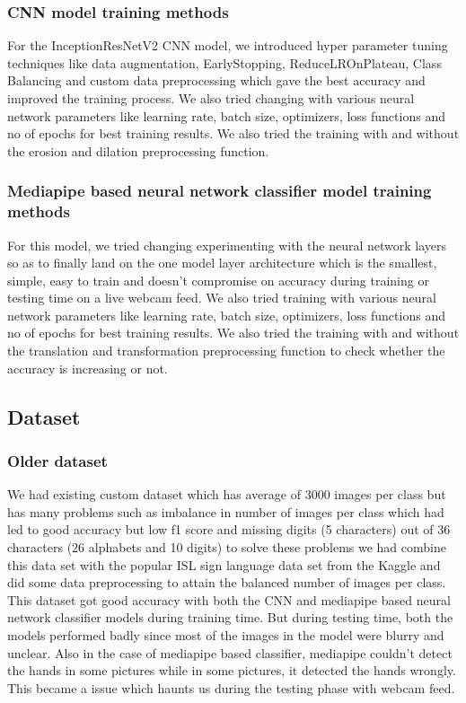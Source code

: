\documentclass[12pt,a4paper]{report}
\begin{document}
\subsubsection{CNN model training methods}
For the InceptionResNetV2 CNN model, we introduced hyper parameter tuning techniques like data augmentation, EarlyStopping, ReduceLROnPlateau, Class Balancing and custom data preprocessing which gave the best accuracy and improved the training process. We also tried changing with various neural network parameters like learning rate, batch size, optimizers, loss functions and no of epochs for best training results. We also tried the training with and without the erosion and dilation preprocessing function.

\subsubsection{Mediapipe based neural network classifier model training methods}
For this model, we tried changing experimenting with the neural network layers so as to finally land on the one model layer architecture which is the smallest, simple, easy to train and doesn't compromise on accuracy during training or testing time on a live webcam feed. We also tried training with various neural network parameters like learning rate, batch size, optimizers, loss functions and no of epochs for best training results. We also tried the training with and without the translation and transformation preprocessing function to check whether the accuracy is increasing or not.

\subsection{Dataset}

\subsubsection{Older dataset}
We had existing custom dataset which has average of 3000 images per class but has many problems such as imbalance in number of images per class which had led to good accuracy but low f1 score and missing digits (5 characters) out of 36 characters (26 alphabets and 10 digits) to solve these problems we had combine this data set with the popular ISL sign language data set from the Kaggle and did some data preprocessing to attain the balanced number of images per class. This dataset got good accuracy with both the CNN and mediapipe based neural network classifier models during training time. But during testing time, both the models performed badly since most of the images in the model were blurry and unclear. Also in the case of mediapipe based classifier, mediapipe couldn't detect the hands in some pictures while in some pictures, it detected the hands wrongly. This became a issue which haunts us during the testing phase with webcam feed.
\end{document}
